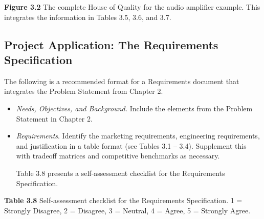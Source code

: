 \textbf{Figure 3.2} The complete House of Quality for the audio
amplifier example. This integrates the information in Tables 3.5, 3.6,
and 3.7.

\subsection{Project Application: The Requirements
Specification}\label{project-application-the-requirements-specification}

The following is a recommended format for a Requirements document that
integrates the Problem Statement from Chapter 2.

\begin{itemize}
\item
  \emph{Needs, Objectives, and Background.} Include the elements from
  the Problem Statement in Chapter 2.
\item
  \emph{Requirements}. Identify the marketing requirements, engineering
  requirements, and justification in a table format (see Tables 3.1 --
  3.4). Supplement this with tradeoff matrices and competitive
  benchmarks as necessary.

  Table 3.8 presents a self-assessment checklist for the Requirements
  Specification.
\end{itemize}

\textbf{Table 3.8} Self-assessment checklist for the Requirements
Specification. 1 = Strongly Disagree, 2 = Disagree, 3 = Neutral, 4 =
Agree, 5 = Strongly Agree.

